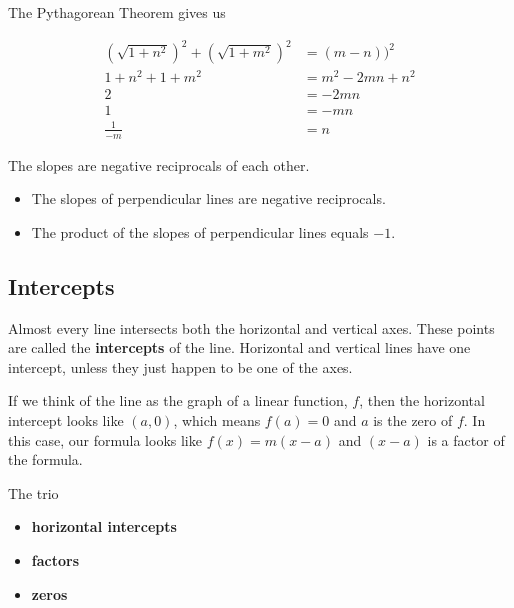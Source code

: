 \documentclass{ximera}
\begin{document}
The Pythagorean Theorem gives us


\begin{align*}
\left(\sqrt{1 + n^2}\right)^2 + \left(\sqrt{1 + m^2}\right)^2 & = (m-n))^2 \\
1 + n^2 + 1 + m^2 & = m^2 - 2 m n + n^2  \\
2 & = -2 m n \\
1 & = -m n \\
\frac{1}{-m} & = n
\end{align*}

The slopes are negative reciprocals of each other. \\


\begin{itemize}
\item The slopes of perpendicular lines are negative reciprocals.
\item The product of the slopes of perpendicular lines equals $-1$.
\end{itemize}



















\subsection*{Intercepts}


Almost every line intersects both the horizontal and vertical axes.  These points are called the \textbf{intercepts} of the line.  Horizontal and vertical lines have one intercept, unless they just happen to be one of the axes. 

If we think of the line as the graph of a linear function, $f$, then the horizontal intercept looks like $(a, 0)$, which means $f(a)=0$ and $a$ is the zero of $f$. In this case, our formula looks like $f(x) = m (x-a)$ and $(x - a)$ is a factor of the formula.



The trio 

\begin{itemize}
\item \textbf{\textcolor{blue!55!black}{horizontal intercepts}} 
\item \textbf{\textcolor{blue!55!black}{factors}} 
\item \textbf{\textcolor{blue!55!black}{zeros}} 
\end{itemize}
\end{document}
